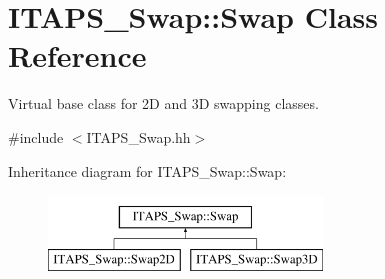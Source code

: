 \hypertarget{class_i_t_a_p_s___swap_1_1_swap}{
\section{ITAPS\_\-Swap::Swap Class Reference}
\label{class_i_t_a_p_s___swap_1_1_swap}
}


Virtual base class for 2D and 3D swapping classes.  




{\ttfamily \#include $<$ITAPS\_\-Swap.hh$>$}

Inheritance diagram for ITAPS\_\-Swap::Swap:\begin{figure}[H]
\begin{center}
\leavevmode
\includegraphics[height=2cm]{class_i_t_a_p_s___swap_1_1_swap}
\end{center}
\end{figure}
